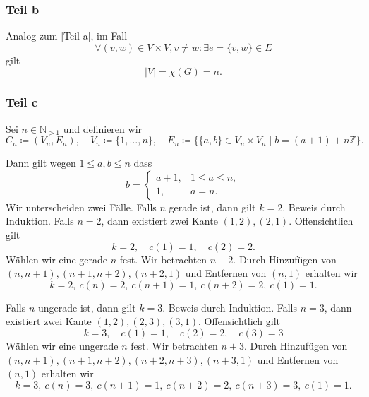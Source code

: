 \documentclass[a5paper]{article}
\providecommand{\abs}[1]{\left\lvert#1\right\rvert}
\theoremstyle{remark}
\begin{document}
\subsubsection{Teil b}
Analog zum [Teil a], im Fall
\[\forall(v, w) \in V \times V, v \ne w\colon \exists e = \{v, w\} \in E\]
gilt
\[\abs{V} = \chi(G) = n.\]

\subsubsection{Teil c}

Sei \(n \in \mathbb{N}_{> 1}\) und definieren wir
\[C_{n} \coloneq (V_{n}, E_{n}),\quad  V_{n} \coloneq \{1, \ldots, n\},\quad  E_{n} \coloneq \{\{a, b\} \in
  V_{n} \times V_{n}\mid b = (a+1) + n\mathbb{Z} \}.\]

Dann gilt wegen \(1 \le a, b \le n\) dass
\[
  b = \begin{cases}
    a + 1, & 1 \le a \le n, \\
    1, & a = n.
  \end{cases}
\]
Wir unterscheiden zwei Fälle.  Falls \(n\) gerade ist, dann gilt \(k =
2\).  Beweis durch Induktion.  Falls \(n = 2\), dann existiert zwei Kante
\((1, 2), (2, 1)\).  Offensichtlich gilt
\[
  k = 2, \quad c(1) = 1, \quad c(2) = 2.
\]  Wählen wir eine
gerade \(n\)  fest.  Wir betrachten \(n + 2\).  Durch Hinzufügen von \((n,
n+1), (n+1, n+2), (n+2, 1)\) und Entfernen von \((n, 1)\) erhalten wir
\[k = 2,~ c(n) = 2,~ c(n+1) = 1,~ c(n+2) = 2,~ c(1) = 1.\]

Falls \(n\) ungerade ist, dann gilt \(k = 3\).
Beweis durch Induktion.  Falls \(n = 3\), dann existiert zwei Kante
\((1, 2), (2, 3), (3, 1)\).  Offensichtlich gilt
\[
  k = 3, \quad c(1) = 1, \quad c(2) = 2, \quad c(3) =3
\]  Wählen wir eine
ungerade \(n\)  fest.  Wir betrachten \(n + 3\).  Durch Hinzufügen von \((n,
n+1), (n+1, n+2), (n+2, n+3), (n+3, 1)\) und Entfernen von \((n, 1)\) erhalten wir
\[k = 3,~ c(n) = 3,~ c(n+1) = 1,~ c(n+2) = 2,~ c(n+3) = 3,~ c(1)=1.\]
\end{document}
